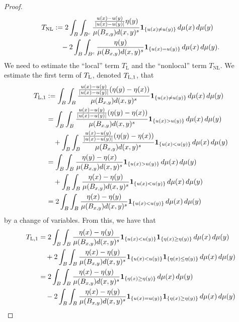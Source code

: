 \documentclass[11pt,leqno]{amsart}
\numberwithin{equation}{section}
\theoremstyle{definition}
\begin{document}
\begin{proof}
{\begin{align*}
				T_{\rm NL} &:= 2\int_{B}\int_{B^c} \frac{\frac{u(x)-u(y)}{|u(x)-u(y)|} \eta(y) }{\mu(B_{x,y}) d(x,y)^s} {\bf 1}_{\{ u(x)\neq u(y)\}}\,d\mu(x)\,d\mu(y)\\
				& \quad -2\int_{B} \int_{B^c} \frac{ \eta(y) }{\mu(B_{x,y}) d(x,y)^s} {\bf 1}_{\{u(x)=u(y)\}}\,d\mu(x)\,d\mu(y).
			\end{align*}
		}
		We need to estimate the ``local'' term $T_{\mathrm{L}}$ and the ``nonlocal''
		term $T_{\mathrm{NL}}$.  
		{We  estimate the first term of $T_{\rm L}$, denoted $T_{\rm L,1}$, that} 
		\begin{align*}
			T_{\rm L, 1} & := \int_B\int_B\frac{\frac{u(x)-u(y)}{|u(x)-u(y)|} (\eta(y)-\eta(x)) }{\mu(B_{x,y}) d(x,y)^s} {\bf 1}_{\{ u(x)\neq  u(y)\}} \,d\mu(x)\,d\mu(y) \\
			&=\int_B\int_B\frac{\frac{u(x)-u(y)}{|u(x)-u(y)|} (\eta(y)-\eta(x)) }{\mu(B_{x,y}) d(x,y)^s} {\bf 1}_{\{ u(x)> u(y)\}} \,d\mu(x)\,d\mu(y)  \notag \\
			&\quad +\int_B\int_B\frac{\frac{u(x)-u(y)}{|u(x)-u(y)|} (\eta(y)-\eta(x)) }{\mu(B_{x,y}) d(x,y)^s} {\bf 1}_{\{ u(x)< u(y)\}} \,d\mu(x)\,d\mu(y) \notag  \\
			&=  \int_B\int_B\frac{\eta(y)-\eta(x) }{\mu(B_{x,y}) d(x,y)^s} {\bf 1}_{\{ u(x)> u(y)\}} \,d\mu(x)\,d\mu(y)  \notag \\
			&\quad +\int_B\int_B\frac{ \eta(x)-\eta(y) }{\mu(B_{x,y}) d(x,y)^s} {\bf 1}_{\{ u(x)< u(y)\}} \,d\mu(x)\,d\mu(y)\notag \\
			&= 2  \int_B\int_B \frac{\eta(x)-\eta(y) }{\mu(B_{x,y}) d(x,y)^s} {\bf 1}_{\{ u(x)< u(y)\}} \,d\mu(x)\,d\mu(y)\notag 
		\end{align*}
		by a change of variables. From this, we have that
		\begin{align}
			T_{\rm L,1}
			&= 2  \int_B\int_B \frac{\eta(x)-\eta(y) }{\mu(B_{x,y}) d(x,y)^s} {\bf 1}_{\{ u(x)< u(y)\}} {\bf 1}_{\{\eta(x)\geq \eta(y)\}} \,d\mu(x)\,d\mu(y)\notag \\
			&\quad + 2  \int_B\int_B \frac{\eta(x)-\eta(y) }{\mu(B_{x,y}) d(x,y)^s} {\bf 1}_{\{ u(x)< u(y)\}} {\bf 1}_{\{\eta(x)\leq \eta(y)\}} \,d\mu(x)\,d\mu(y)\notag \\
			&=  2\int_B\int_B \frac{\eta(x)-\eta(y) }{\mu(B_{x,y}) d(x,y)^s} {\bf 1}_{\{ \eta(x)\geq \eta(y)\}} \,d\mu(x)\,d\mu(y)\notag \\ 
			&\quad - 2  \int_B\int_B \frac{\eta(x)-\eta(y) }{\mu(B_{x,y}) d(x,y)^s} {\bf 1}_{\{ u(x)= u(y)\}} {\bf 1}_{\{\eta(x)\geq \eta(y)\}} \,d\mu(x)\,d\mu(y) \notag \\

\end{align}
\end{proof}
\end{document}
